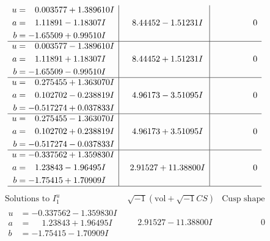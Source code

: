\documentclass[1p]{elsarticle_modified}
\theoremstyle{definition}
\newcommand{\I}{\sqrt{-1}}
\begin{document}
$$\begin{array}{c|c|c}
\begin{aligned}
u &= \phantom{-}0.003577 + 1.389610 I \\
a &= \phantom{-}1.11891 - 1.18307 I \\
b &= -1.65509 + 0.99510 I\end{aligned}
 & \phantom{-}8.44452 - 1.51231 I & \phantom{-0.000000 } 0 \\ \hline\begin{aligned}
u &= \phantom{-}0.003577 - 1.389610 I \\
a &= \phantom{-}1.11891 + 1.18307 I \\
b &= -1.65509 - 0.99510 I\end{aligned}
 & \phantom{-}8.44452 + 1.51231 I & \phantom{-0.000000 } 0 \\ \hline\begin{aligned}
u &= \phantom{-}0.275455 + 1.363070 I \\
a &= \phantom{-}0.102702 - 0.238819 I \\
b &= -0.517274 + 0.037833 I\end{aligned}
 & \phantom{-}4.96173 - 3.51095 I & \phantom{-0.000000 } 0 \\ \hline\begin{aligned}
u &= \phantom{-}0.275455 - 1.363070 I \\
a &= \phantom{-}0.102702 + 0.238819 I \\
b &= -0.517274 - 0.037833 I\end{aligned}
 & \phantom{-}4.96173 + 3.51095 I & \phantom{-0.000000 } 0 \\ \hline\begin{aligned}
u &= -0.337562 + 1.359830 I \\
a &= \phantom{-}1.23843 - 1.96495 I \\
b &= -1.75415 + 1.70909 I\end{aligned}
 & \phantom{-}2.91527 + 11.38800 I & \phantom{-0.000000 } 0\\
 \hline 
 \end{array}$$\newpage$$\begin{array}{c|c|c}  
\text{Solutions to }I^u_{1}& \I (\text{vol} + \sqrt{-1}CS) & \text{Cusp shape}\\
 \hline 
\begin{aligned}
u &= -0.337562 - 1.359830 I \\
a &= \phantom{-}1.23843 + 1.96495 I \\
b &= -1.75415 - 1.70909 I\end{aligned}
 & \phantom{-}2.91527 - 11.38800 I & \phantom{-0.000000 } 0 \\ \hline\begin{aligned}

\end{aligned}
\end{array}$$
\end{document}
